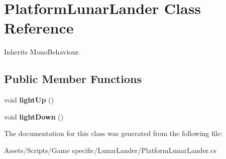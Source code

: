 \hypertarget{class_platform_lunar_lander}{\section{Platform\-Lunar\-Lander Class Reference}
\label{class_platform_lunar_lander}
}


Inherits Mono\-Behaviour.

\subsection*{Public Member Functions}
\begin{DoxyCompactItemize}
\item 
\hypertarget{class_platform_lunar_lander_af732bb6912ebb04d0cd68ecc82fa471b}{void {\bfseries light\-Up} ()}\label{class_platform_lunar_lander_af732bb6912ebb04d0cd68ecc82fa471b}

\item 
\hypertarget{class_platform_lunar_lander_ab1f1daabac9fcb0043438014dfbde1e7}{void {\bfseries light\-Down} ()}\label{class_platform_lunar_lander_ab1f1daabac9fcb0043438014dfbde1e7}

\end{DoxyCompactItemize}


The documentation for this class was generated from the following file\-:\begin{DoxyCompactItemize}
\item 
Assets/\-Scripts/\-Game specific/\-Lunar\-Lander/Platform\-Lunar\-Lander.\-cs\end{DoxyCompactItemize}
